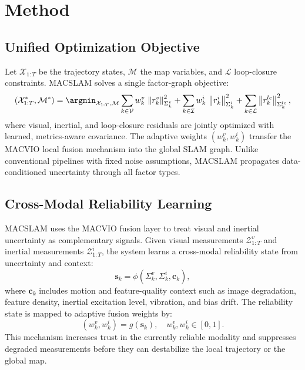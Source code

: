\section{Method}
\label{sec:macslam:method}

\subsection{Unified Optimization Objective}

Let $\mathcal{X}_{1:T}$ be the trajectory states, $\mathcal{M}$ the map variables, and $\mathcal{L}$ loop-closure constraints.
MACSLAM solves a single factor-graph objective:
\begin{equation}
\label{eq:macslam:objective}
(\mathcal{X}_{1:T}^{*}, \mathcal{M}^{*})
=
\argmin_{\mathcal{X}_{1:T},\mathcal{M}}
\sum_{k\in\mathcal{V}} w_k^{v}\, \left\| r_k^{v} \right\|_{{\Sigma}_k^{v}}^{2}
+
\sum_{k\in\mathcal{I}} w_k^{i}\, \left\| r_k^{i} \right\|_{{\Sigma}_k^{i}}^{2}
+
\sum_{k\in\mathcal{L}} \left\| r_k^{lc} \right\|_{{\Sigma}_k^{lc}}^{2},
\end{equation}
where visual, inertial, and loop-closure residuals are jointly optimized with learned, metrics-aware covariance.
The adaptive weights $(w_k^{v}, w_k^{i})$ transfer the MACVIO local fusion mechanism into the global SLAM graph.
Unlike conventional pipelines with fixed noise assumptions, MACSLAM propagates data-conditioned uncertainty through all factor types.

\subsection{Cross-Modal Reliability Learning}

MACSLAM uses the MACVIO fusion layer to treat visual and inertial uncertainty as complementary signals.
Given visual measurements $\mathcal{Z}_{1:T}^{v}$ and inertial measurements $\mathcal{Z}_{1:T}^{i}$, the system learns a cross-modal reliability state from uncertainty and context:
\begin{equation}
\label{eq:macslam:reliability_state}
\mathbf{s}_k = \phi\!\left({\Sigma}_k^{v}, {\Sigma}_k^{i}, \mathbf{c}_k\right),
\end{equation}
where $\mathbf{c}_k$ includes motion and feature-quality context such as image degradation, feature density, inertial excitation level, vibration, and bias drift.
The reliability state is mapped to adaptive fusion weights by:
\begin{equation}
\label{eq:macslam:fusion_weights}
\left(w_k^{v}, w_k^{i}\right) = g(\mathbf{s}_k), \quad w_k^{v}, w_k^{i}\in[0,1].
\end{equation}
This mechanism increases trust in the currently reliable modality and suppresses degraded measurements before they can destabilize the local trajectory or the global map.

